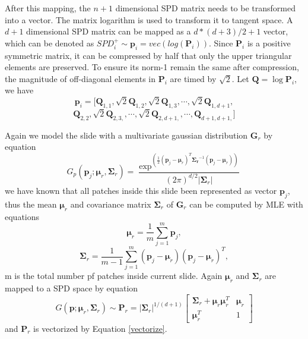 After this mapping, the $n+1$ dimensional SPD matrix needs to be transformed into a vector. The matrix logarithm is used to transform it to tangent space. A $d+1$ dimensional SPD matrix can be mapped as a $d*(d+3)/2+1$ vector, which can be denoted as $SPD_i^+ \sim \bm{p}_i = vec(log(\bm{P}_i))$. Since $\bm{P}_i$ is a positive symmetric matrix, it can be compressed by half that only the upper triangular elements are preserved. To ensure its norm-1 remain the same after compression, the magnitude of off-diagonal elements in $\bm{P}_i$ are timed by $\sqrt2$.  Let $\bm{Q}=\log{\bm{P}_i}$, we have
\begin{equation}\label{vectorize}
 \bm{p}_i = [\bm{Q}_{1,1},\sqrt2\bm{Q}_{1,2},\sqrt2\bm{Q}_{1,3},\cdots,\sqrt2\bm{Q}_{1,d+1},
 \end{equation}
 \begin{equation}
 \bm{Q}_{2,2},\sqrt2\bm{Q}_{2,3,},\cdots,\sqrt2\bm{Q}_{2,d+1,},\cdots,\bm{Q}_{d+1,d+1,}]
\end{equation}


Again we model the slide with a multivariate gaussian distribution $\bm{G}_r$ by equation
\begin{equation}
G_p(\bm{p}_j;\bm{\mu}_r,\bm{\Sigma}_r) = \frac{\exp^{(\frac{1}{2}(\bm{p}_j-\bm{\mu}_r)^T\bm{\Sigma_r}^{-1}(\bm{p}_j-\bm{\mu}_r))}}{(2\pi)^{d/2}|{\bm{\Sigma}_r|}} 
\end{equation}
we have known that all patches inside this slide been represented as vector $\bm{p}_j$, thus the mean $\bm{\mu}_r$ and covariance matrix ${\bm{\Sigma}}_r$ of $\bm{G}_r$ can be computed by MLE with equations
\begin{equation}
\bm{\mu}_r = \frac{1}{m}\sum_{j = 1}^m \bm{p}_j,
\end{equation}
\begin{equation}
\bm{\Sigma}_r = \frac{1}{m -1} \sum_{j = 1}^m(\bm{p}_j-\bm{\mu}_r)(\bm{p}_j-\bm{\mu}_r)^T,
\end{equation}
m is the total number pf patches inside current slide. Again $\bm{\mu}_r$ and $\bm{\Sigma}_r$ are mapped to a SPD space by equation
\begin{equation}
G(\bm{p};\bm{\mu}_r,\bm{\Sigma}_r) \sim \bm{P}_r  = |\bm{\Sigma}_r|^{1/(d+1)} \left[ \begin{matrix}
\bm{\Sigma}_r + \bm{\mu}_r\bm{\mu}_r^T & \bm{\mu}_r \\
\bm{\mu}_r^T & 1
\end{matrix}
\right]
\end{equation}
and $\bm{P}_r$ is vectorized by Equation \ref{vectorize}.

